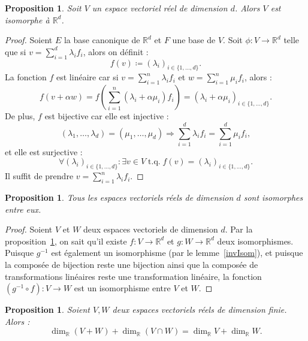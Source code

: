 \documentclass{article}
\DeclareMathOperator{\tq}{\text{ t.q. }}
\newcommand{\R}{\mathbb R}
\newtheorem{prp}[thm]{Proposition}
\theoremstyle{definition}
\theoremstyle{remark}
\begin{document}
		\begin{prp}\label{dimDIsomorpheRd} Soit $V$ un espace vectoriel réel de dimension $d$. Alors $V$ est isomorphe à $\R^d$. \end{prp}

		\begin{proof} Soient $E$ la base canonique de $\R^d$ et $F$ une base de $V$. Soit $\phi : V \to \R^d$ telle que si $v = \sum_{i=1}^d\lambda_if_i$, alors on définit :
		\[f(v) \coloneqq (\lambda_i)_{i \in \{1, \ldots, d\}}.\] La fonction $f$ est linéaire car si $v = \sum_{i=1}^n\lambda_if_i$ et $w = \sum_{i=1}^n\mu_if_i$, alors :
		\[f(v + \alpha w) = f\left(\sum_{i=1}^n(\lambda_i + \alpha\mu_i)f_i\right) = (\lambda_i + \alpha\mu_i)_{i \in \{1, \ldots, d\}}.\] De plus, $f$ est bijective car elle
		est injective : \[(\lambda_1, \ldots, \lambda_d) = (\mu_1, \ldots, \mu_d) \Rightarrow \sum_{i=1}^d\lambda_if_i = \sum_{i=1}^d\mu_if_i,\] et elle est surjective :
		\[\forall (\lambda_i)_{i \in \{1, \ldots, d\}} : \exists v \in V \tq f(v) = (\lambda_i)_{i \in \{1, \ldots, d\}}.\] Il suffit de prendre $v = \sum_{i=1}^n\lambda_if_i$.
		\end{proof}

		\begin{prp}\label{dimDIso} Tous les espaces vectoriels réels de dimension $d$ sont isomorphes entre eux. \end{prp}
		
		\begin{proof} Soient $V$ et $W$ deux espaces vectoriels de dimension $d$. Par la proposition~\ref{dimDIsomorpheRd}, on sait qu'il existe $f : V \to \R^d$
		et $g : W \to \R^d$ deux isomorphismes. Puisque $g^{-1}$ est également un isomorphisme (par le lemme~\ref{invIsom}), et puisque la composée de bijection reste
		une bijection ainsi que la composée de transformations linéaires reste une transformation linéaire, la fonction $(g^{-1} \circ f) : V \to W$ est un isomorphisme
		entre $V$ et $W$. \end{proof}

		\begin{prp} Soient $V, W$ deux espaces vectoriels réels de dimension finie. Alors : \[\dim_\R(V+W) + \dim_\R(V \cap W) = \dim_\R V + \dim_\R W.\] \end{prp}
\end{document}
